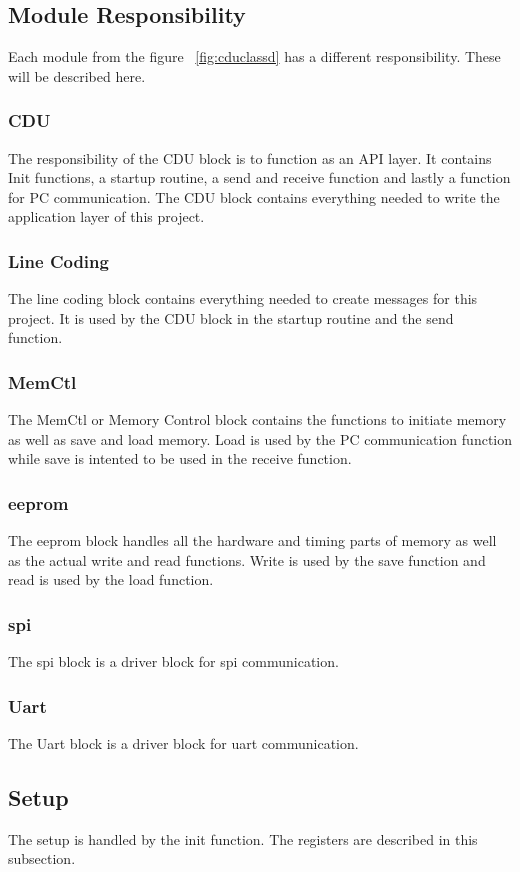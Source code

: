 \subsection{Module Responsibility}
Each module from the figure ~\ref{fig:cduclassd} has a different responsibility. These will be described here.
\subsubsection{CDU}
The responsibility of the CDU block is to function as an API layer. It contains Init functions, a startup routine, a send and receive function and lastly a function for PC communication. The CDU block contains everything needed to write the application layer of this project.\\
\subsubsection{Line Coding}
The line coding block contains everything needed to create messages for this project. It is used by the CDU block in the startup routine and the send function.
\subsubsection{MemCtl}
The MemCtl or Memory Control block contains the functions to initiate memory as well as save and load memory. Load is used by the PC communication function while save is intented to be used in the receive function. 
\subsubsection{eeprom}
The eeprom block handles all the hardware and timing parts of memory as well as the actual write and read functions. Write is used by the save function and read is used by the load function.
\subsubsection{spi}
The spi block is a driver block for spi communication.
\subsubsection{Uart}
The Uart block is a driver block for uart communication.

\subsection{Setup}
The setup is handled by the init function. The registers are described in this subsection.

